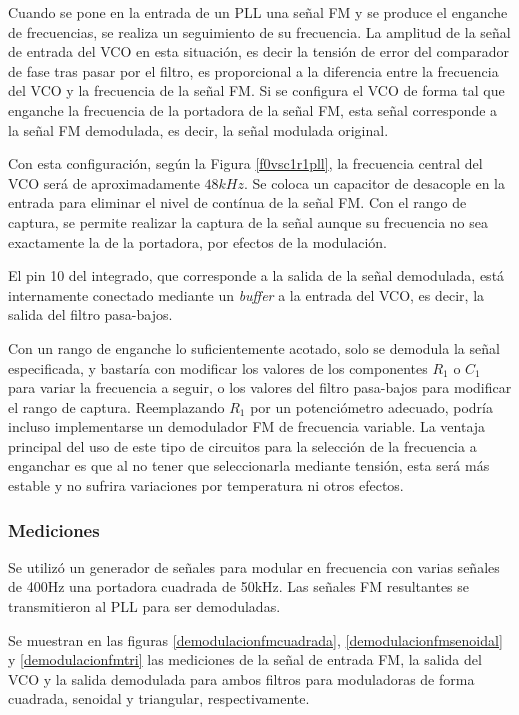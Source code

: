 Cuando se pone en la entrada de un PLL una señal FM y se produce el enganche de frecuencias, se realiza un seguimiento de su frecuencia. La amplitud de la señal de entrada del VCO en esta situación, es decir la tensión de error del comparador de fase tras pasar por el filtro, es proporcional a la diferencia entre la frecuencia del VCO y la frecuencia de la señal FM. Si se configura el VCO de forma tal que enganche la frecuencia de la portadora de la señal FM, esta señal corresponde a la señal FM demodulada, es decir, la señal modulada original.

Con esta configuración, según la Figura \ref{f0vsc1r1pll}, la frecuencia central del VCO será de aproximadamente $48kHz$. Se coloca un capacitor de desacople en la entrada para eliminar el nivel de contínua de la señal FM. Con el rango de captura, se permite realizar la captura de la señal aunque su frecuencia no sea exactamente la de la portadora, por efectos de la modulación.

El pin 10 del integrado, que corresponde a la salida de la señal demodulada, está internamente conectado mediante un \emph{buffer} a la entrada del VCO, es decir, la salida del filtro pasa-bajos.

Con un rango de enganche lo suficientemente acotado, solo se demodula la señal especificada, y bastaría con modificar los valores de los componentes $R_{1}$ o $C_{1}$ para variar la frecuencia a seguir, o los valores del filtro pasa-bajos para modificar el rango de captura. Reemplazando $R_{1}$ por un potenciómetro adecuado, podría incluso implementarse un demodulador FM de frecuencia variable. La ventaja principal del uso de este tipo de circuitos para la selección de la frecuencia a enganchar es que al no tener que seleccionarla mediante tensión, esta será más estable y no sufrira variaciones por temperatura ni otros efectos.

\subsubsection{Mediciones}
Se utilizó un generador de señales para modular en frecuencia con varias señales de 400Hz una portadora cuadrada de 50kHz. Las señales FM resultantes se transmitieron al PLL para ser demoduladas.


Se muestran en las figuras \ref{demodulacionfmcuadrada}, \ref{demodulacionfmsenoidal} y \ref{demodulacionfmtri} las mediciones de la señal de entrada FM, la salida del VCO y la salida demodulada para ambos filtros para moduladoras de forma cuadrada, senoidal y triangular, respectivamente. 

